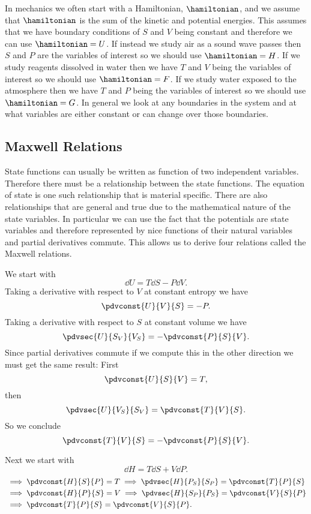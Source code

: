     In mechanics we often start with a Hamiltonian, \(\hamiltonian\), and we assume that \(\hamiltonian\) is the sum of the kinetic and potential energies.
    This assumes that we have boundary conditions of \(S\) and \(V\) being constant and therefore we can use \(\hamiltonian = U\).
    If instead we study air as a sound wave passes then \(S\) and \(P\) are the variables of interest so we should use \(\hamiltonian = H\).
    If we study reagents dissolved in water then we have \(T\) and \(V\) being the variables of interest so we should use \(\hamiltonian = F\).
    If we study water exposed to the atmosphere then we have \(T\) and \(P\) being the variables of interest so we should use \(\hamiltonian = G\).
    In general we look at any boundaries in the system and at what variables are either constant or can change over those boundaries.
    
    \subsection{Maxwell Relations}
    State functions can usually be written as function of two independent variables.
    Therefore there must be a relationship between the state functions.
    The equation of state is one such relationship that is material specific.
    There are also relationships that are general and true due to the mathematical nature of the state variables.
    In particular we can use the fact that the potentials are state variables and therefore represented by nice functions of their natural variables and partial derivatives commute.
    This allows us to derive four relations called the Maxwell relations.
    
    We start with
    \[\dd{U} = T\dd{S} - P\dd{V}.\]
    Taking a derivative with respect to \(V\) at constant entropy we have
    \[\pdvconst{U}{V}{S} = -P.\]
    Taking a derivative with respect to \(S\) at constant volume we have
    \[\pdvsec{U}{S_V}{V_S} = -\pdvconst{P}{S}{V}.\]
    Since partial derivatives commute if we compute this in the other direction we must get the same result:
    First
    \[\pdvconst{U}{S}{V} = T,\]
    then
    \[\pdvsec{U}{V_S}{S_V} = \pdvconst{T}{V}{S}.\]
    So we conclude
    \[\pdvconst{T}{V}{S} = -\pdvconst{P}{S}{V}.\]
    
    Next we start with
    \[\dd{H} = T\dd{S} + V\dd{P}.\]
    \begin{align*}
        &\implies \pdvconst{H}{S}{P} = T \implies \pdvsec{H}{P_S}{S_P} = \pdvconst{T}{P}{S}\\
        &\implies \pdvconst{H}{P}{S} = V \implies \pdvsec{H}{S_P}{P_S} = \pdvconst{V}{S}{P}\\
        &\implies \pdvconst{T}{P}{S} = \pdvconst{V}{S}{P}.
    \end{align*}

